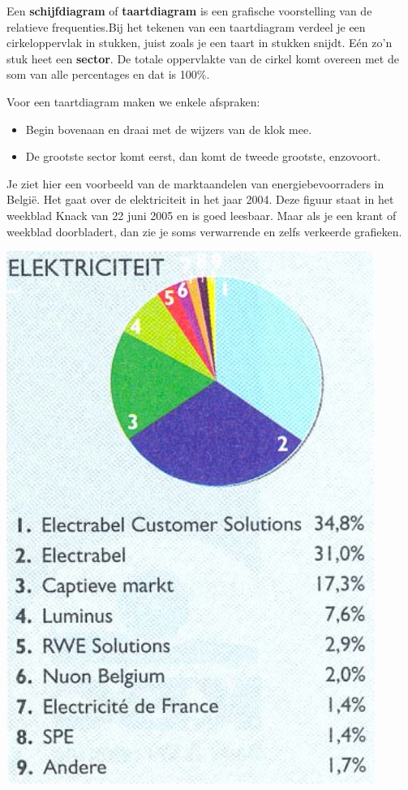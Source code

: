 \documentclass[12pt,twoside,a4paper]{article}
\begin{document}
\begin{minipage}{0.5\linewidth}
Een {\bf schijfdiagram} of {\bf taartdiagram} is een grafische voorstelling van de relatieve frequenties.Bij het tekenen van een taartdiagram verdeel je een cirkeloppervlak in stukken, juist zoals je een taart in stukken snijdt. Eén zo'n stuk heet een {\bf sector}. De totale oppervlakte van de cirkel komt overeen met de som van alle percentages en dat is 100\%.

Voor een taartdiagram maken we enkele afspraken:
\begin{itemize}
  \item Begin bovenaan en draai met de wijzers van de klok mee.
  \item De grootste sector komt eerst, dan komt de tweede
grootste, enzovoort.
\end{itemize}

Je ziet hier een voorbeeld van de marktaandelen van energiebevoorraders in België. Het gaat over de elektriciteit in het jaar 2004. Deze figuur staat in het weekblad Knack van 22 juni 2005 en is goed leesbaar. Maar als je een krant of weekblad doorbladert, dan zie je soms verwarrende en zelfs verkeerde grafieken.
\end{minipage}
\begin{minipage}{0.5\linewidth}
\begin{center}
  \includegraphics[width=0.9\textwidth]{cirkeldiagram_electriciteit}
\end{center}
\end{minipage}
\end{document}
